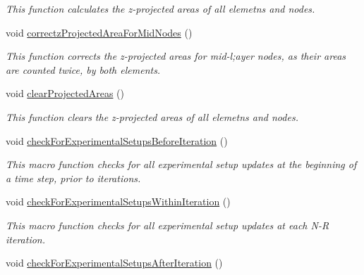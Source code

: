 \begin{DoxyCompactItemize}
\begin{DoxyCompactList}\small\item\em This function calculates the z-\/projected areas of all elemetns and nodes. \end{DoxyCompactList}\item 
void \hyperlink{classSimulation_a7a47dfca0623a5636cb65416411cb901}{correctz\+Projected\+Area\+For\+Mid\+Nodes} ()
\begin{DoxyCompactList}\small\item\em This function corrects the z-\/projected areas for mid-\/l;ayer nodes, as their areas are counted twice, by both elements. \end{DoxyCompactList}\item 
\hypertarget{classSimulation_a9c3f5acaa8ec130dedc94dfd6f7b013a}{}void \hyperlink{classSimulation_a9c3f5acaa8ec130dedc94dfd6f7b013a}{clear\+Projected\+Areas} ()\label{classSimulation_a9c3f5acaa8ec130dedc94dfd6f7b013a}

\begin{DoxyCompactList}\small\item\em This function clears the z-\/projected areas of all elemetns and nodes. \end{DoxyCompactList}\item 
\hypertarget{classSimulation_aa9ad0627365ad5d465b273183c7db344}{}void \hyperlink{classSimulation_aa9ad0627365ad5d465b273183c7db344}{check\+For\+Experimental\+Setups\+Before\+Iteration} ()\label{classSimulation_aa9ad0627365ad5d465b273183c7db344}

\begin{DoxyCompactList}\small\item\em This macro function checks for all experimental setup updates at the beginning of a time step, prior to iterations. \end{DoxyCompactList}\item 
\hypertarget{classSimulation_a2ebd37d36e25d118738d25811da4aa45}{}void \hyperlink{classSimulation_a2ebd37d36e25d118738d25811da4aa45}{check\+For\+Experimental\+Setups\+Within\+Iteration} ()\label{classSimulation_a2ebd37d36e25d118738d25811da4aa45}

\begin{DoxyCompactList}\small\item\em This macro function checks for all experimental setup updates at each N-\/\+R iteration. \end{DoxyCompactList}\item 
\hypertarget{classSimulation_ae8b5dcc56bb2633d284a413f1e9dc1e9}{}void \hyperlink{classSimulation_ae8b5dcc56bb2633d284a413f1e9dc1e9}{check\+For\+Experimental\+Setups\+After\+Iteration} ()\label{classSimulation_ae8b5dcc56bb2633d284a413f1e9dc1e9}


\end{DoxyCompactItemize}
